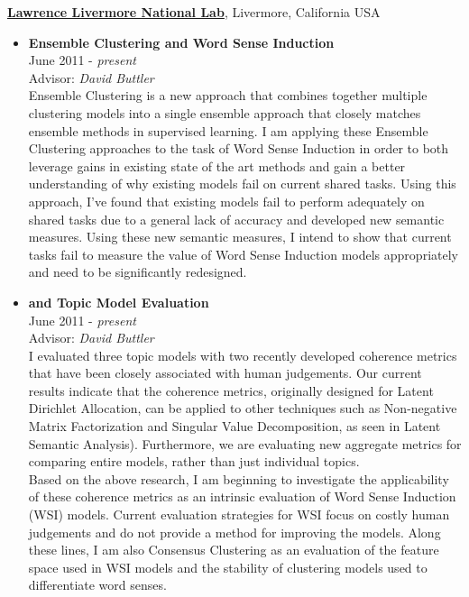 \documentclass[10pt]{article}
\newenvironment{outerlist}[1][\enskip\textbullet]%
        {\begin{itemize}[#1,leftmargin=*]}{\end{itemize}%
         \vspace{-.6\baselineskip}}
\begin{document}
\href{http://www.llnl.gov/}{\textbf{Lawrence Livermore National Lab}},
Livermore, California USA
\begin{outerlist}

\item[] \textbf{Ensemble Clustering and Word Sense Induction} \\
        June 2011 - \textit{present} \\
        Advisor: \textit{David Buttler} \\

        Ensemble Clustering is a new approach that combines together multiple
        clustering models into a single ensemble approach that closely matches
        ensemble methods in supervised learning.  I am applying these Ensemble
        Clustering approaches to the task of Word Sense Induction in order to
        both leverage gains in existing state of the art methods and gain a
        better understanding of why existing models fail on current shared
        tasks.  Using this approach, I've found that existing models fail to
        perform adequately on shared tasks due to a general lack of accuracy
        and developed new semantic measures.  Using these new semantic measures,
        I intend to show that current tasks fail to measure the value of Word
        Sense Induction models appropriately and need to be significantly redesigned.

\item[] \textbf{and Topic Model Evaluation} \\
        June 2011 - \textit{present} \\
        Advisor: \textit{David Buttler} \\

        I evaluated three topic models with two recently developed coherence
        metrics that have been closely associated with human judgements.  Our
        current results indicate that the coherence metrics, originally designed
        for Latent Dirichlet Allocation, can be applied to other techniques such
        as Non-negative Matrix Factorization and Singular Value
        Decomposition, as seen in Latent Semantic Analysis).  Furthermore,
        we are evaluating new aggregate metrics for comparing entire models,
        rather than just individual topics. \\

        Based on the above research, I am beginning to investigate the
        applicability of these coherence metrics as an intrinsic evaluation of
        Word Sense Induction (WSI) models.  Current evaluation strategies for
        WSI focus on costly human judgements and do not provide a method for
        improving the models.  Along these lines, I am also Consensus Clustering
        as an evaluation of the feature space used in WSI models and the
        stability of clustering models used to differentiate word senses. \\


\end{outerlist}
\end{document}
